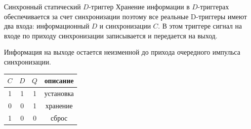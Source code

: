 \documentclass[a4paper]{article}
\begin{document}
Синхронный статический $D$-триггер
Хранение информации в $D$-триггерах обеспечивается за счет синхронизации поэтому все реальные D-триггеры имеют два входа: информационный $D$ и синхронизации $C$. В этом триггере сигнал на входе по приходу синхронизации записывается и передается на выход.

Информация на выходе остается неизменной до прихода очередного импульса синхронизации. 

\begin{table}[ht]
\centering
\begin{tabular}{|c|c|c|c|}
    \hline
    $C$ & $D$ & $Q$  & описание \\
    \hline
    1 & 1 & 1 & установка\\
    0 & 0 & 1 & хранение \\
    1 & 0 & 0 & сброс \\
    \hline
\end{tabular}
\end{table}
\end{document}
